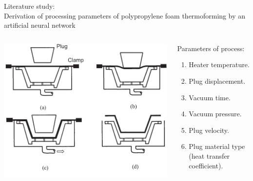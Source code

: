 \documentclass{beamer}
\begin{document}
	\begin{frame}{Literature study:\\Derivation of processing parameters of polypropylene foam thermoforming by an artificial neural network}
		\begin{columns}
			\begin{column}{0.5\textwidth}
				\begin{center}
					\includegraphics[width=\textwidth]{Figures/CupProcessNoExplenation.pdf}
				\end{center}
			\end{column}
			\begin{column}{0.5\textwidth}  %
				Parameters of process:
				\begin{enumerate}
					\item Heater temperature.
					\item Plug displacement.
					\item Vacuum time.
					\item Vacuum pressure.
					\item Plug velocity.
					\item Plug material type (heat transfer coefficient).
				\end{enumerate}
			\end{column}
		\end{columns}
	\end{frame}
\end{document}
